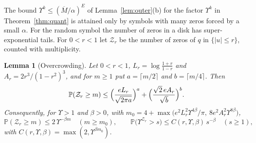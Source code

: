 \documentclass[11pt]{amsart}
\newtheorem{lemma}[theorem]{Lemma}
\theoremstyle{definition}
\theoremstyle{remark}
\numberwithin{equation}{section}
\newcommand{\PP}{\mathbb{P}}
\begin{document}
The bound $\Upsilon^k\le(\overline M/\alpha)^E$ of Lemma~\ref{lem:outer}(b) for the factor $\Upsilon^k$ in Theorem~\ref{thm:quant} is attained only by symbols with many zeros forced by a small $\alpha$. For the random symbol the number of zeros in a disk has super-exponential tails. For $0<r<1$ let $\mathcal Z_r$ be the number of zeros of $q$ in $\{|u|\le r\}$, counted with multiplicity.

\begin{lemma}[Overcrowding]\label{lem:overcrowd}
Let $0<r<1$, $L_r=\log\frac{1+r}{1-r}$ and $A_r=2r^3/(1-r^2)^3$, and for $m\ge1$ put $a=\lceil m/2\rceil$ and $b=\lceil m/4\rceil$. Then
\[
\PP(\mathcal Z_r\ge m)\le\Bigl(\frac{eL_r}{\sqrt{2\pi a}}\Bigr)^a+\Bigl(\frac{\sqrt2\,eA_r}{\sqrt b}\Bigr)^b .
\]
Consequently, for $\Upsilon>1$ and $\beta>0$, with $m_0=4+\max\bigl(e^2L_r^2\Upsilon^{4\beta}/\pi,\ 8e^2A_r^2\Upsilon^{8\beta}\bigr)$,
\[
\PP(\mathcal Z_r\ge m)\le2\,\Upsilon^{-\beta m}\quad(m\ge m_0),\qquad\PP\bigl(\Upsilon^{\mathcal Z_r}>s\bigr)\le C(r,\Upsilon,\beta)\,s^{-\beta}\quad(s\ge1),
\]
with $C(r,\Upsilon,\beta)=\max(2,\Upsilon^{\beta m_0})$.
\end{lemma}
\end{document}
